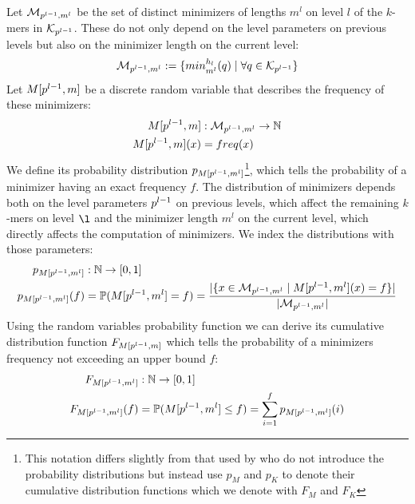 \documentclass[a4paper,titlepage,onecolumn,oneside,12pt,nenglish,titlepage=firstiscover]{scrbook}
\theoremstyle{plain} %
\theoremstyle{definition} %
\theoremstyle{remark} %
\theoremstyle{plain}
\newcommand{\NN}{\mathbb{N}} %
\newcommand{\minimizerLength}{m}
\newcommand{\level}{l}
\newcommand{\minimizer}{x}
\newcommand{\kmer}{q}
\begin{document}
Let $\distinctMinimizers{\level}$ be the set of distinct minimizers of lengths $\minimizerLength^\level$ on level $\level$ of the $k$-mers in $\distinctKmers{\level}$. These do not only depend on the level parameters on previous levels but also on the minimizer length on the current level:
\begin{equation}
	\distinctMinimizers{\level} := \{\minimizerOf{\kmer}{\level} \mid \forall \kmer \in \distinctKmers{\level}\}
\end{equation}
Let $\manualZV{M}{\levelParameters{\level-1}}{m}$ be a discrete random variable that describes the frequency of these minimizers:
\begin{align}
	\manualZV{M}{\levelParameters{\level-1}}{m} &: \distinctMinimizers{\level} \rightarrow \NN
	\\
	\manualZV{M}{\levelParameters{\level-1}}{m}(\minimizer) &= \frequencyOf{\minimizer}
\end{align}
We define its probability distribution $\probabilityDistribution{\manualZV{M}{\levelParameters{\level-1}}{\minimizerLength^\level}}$\footnote{This notation differs slightly from that used by \citet{schulte-mattler_rshash_2026} who do not introduce the probability distributions but instead use $p_M$ and $p_K$ to denote their cumulative distribution functions which we denote with $F_M$ and $F_K$}, which tells the probability of a minimizer having an exact frequency $f$. The distribution of minimizers depends both on the level parameters $\levelParameters{\level-1}$ on previous levels, which affect the remaining $k$-mers on level $\l$ and the minimizer length $\minimizerLength^\level$ on the current level, which directly affects the computation of minimizers. We index the distributions with those parameters:
\begin{align}
	\probabilityDistribution{\manualZV{M}{\levelParameters{\level-1}}{\minimizerLength^\level}} &: \NN \rightarrow [0,1]
	\\
	\probabilityDistribution{\manualZV{M}{\levelParameters{\level-1}}{\minimizerLength^\level}}(f) &= \mathbb{P}(\manualZV{M}{\levelParameters{\level-1}}{\minimizerLength^\level} = f) = \frac{|\{\minimizer \in \distinctMinimizers{\level} \mid 
		\manualZV{M}{\levelParameters{\level-1}}{\minimizerLength^\level}(\minimizer)=f \}|}{|\distinctMinimizers{\level}|}
\end{align}
Using the random variables probability function we can derive its cumulative distribution function $\CDF{\manualZV{M}{\levelParameters{\level-1}}{m}}$ which tells the probability of a minimizers frequency not exceeding an upper bound $f$: 
\begin{align}
	\CDF{\manualZV{M}{\levelParameters{\level-1}}{\minimizerLength^\level}} &: \NN \rightarrow [0,1]\\
	\CDF{\manualZV{M}{\levelParameters{\level-1}}{\minimizerLength^\level}}(f) &= \mathbb{P}(\manualZV{M}{\levelParameters{\level-1}}{\minimizerLength^\level} \leq f) = \sum_{i=1}^f \probabilityDistribution{\manualZV{M}{\levelParameters{\level-1}}{\minimizerLength^\level}}(i)
\end{align}
\end{document}
